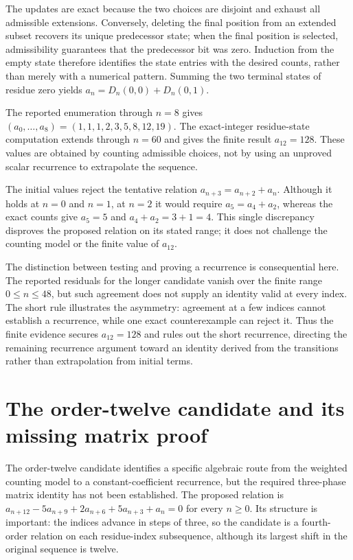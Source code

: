 \documentclass[11pt]{article}
\begin{document}
The updates are exact because the two choices are disjoint and exhaust all admissible extensions. Conversely, deleting the final position from an extended subset recovers its unique predecessor state; when the final position is selected, admissibility guarantees that the predecessor bit was zero. Induction from the empty state therefore identifies the state entries with the desired counts, rather than merely with a numerical pattern. Summing the two terminal states of residue zero yields $a_n=D_n(0,0)+D_n(0,1)$.

The reported enumeration through $n=8$ gives $(a_0,\ldots,a_8)=(1,1,1,2,3,5,8,12,19)$. The exact-integer residue-state computation extends through $n=60$ and gives the finite result $a_{12}=128$. These values are obtained by counting admissible choices, not by using an unproved scalar recurrence to extrapolate the sequence.

The initial values reject the tentative relation $a_{n+3}=a_{n+2}+a_n$. Although it holds at $n=0$ and $n=1$, at $n=2$ it would require $a_5=a_4+a_2$, whereas the exact counts give $a_5=5$ and $a_4+a_2=3+1=4$. This single discrepancy disproves the proposed relation on its stated range; it does not challenge the counting model or the finite value of $a_{12}$.

The distinction between testing and proving a recurrence is consequential here. The reported residuals for the longer candidate vanish over the finite range $0\leq n\leq48$, but such agreement does not supply an identity valid at every index. The short rule illustrates the asymmetry: agreement at a few indices cannot establish a recurrence, while one exact counterexample can reject it. Thus the finite evidence secures $a_{12}=128$ and rules out the short recurrence, directing the remaining recurrence argument toward an identity derived from the transitions rather than extrapolation from initial terms.

\section{The order-twelve candidate and its missing matrix proof}
The order-twelve candidate identifies a specific algebraic route from the weighted counting model to a constant-coefficient recurrence, but the required three-phase matrix identity has not been established. The proposed relation is $a_{n+12}-5a_{n+9}+2a_{n+6}+5a_{n+3}+a_n=0$ for every $n\geq0$. Its structure is important: the indices advance in steps of three, so the candidate is a fourth-order relation on each residue-index subsequence, although its largest shift in the original sequence is twelve.
\end{document}
